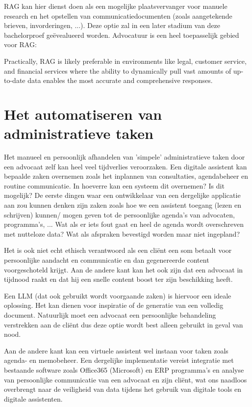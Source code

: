 RAG kan hier dienst doen als een mogelijke plaatsvervanger voor manuele research en het opstellen van communicatiedocumenten (zoals aangetekende brieven, invorderingen, ...). Deze optie zal in
een later stadium van deze bachelorproef geëvealueerd worden. Advocatuur is een heel toepasselijk gebied voor RAG:

\begin{displayquote}
	Practically, RAG is likely preferable in environments like
	legal, customer service, and financial services where the ability to
	dynamically pull vast amounts of up-to-date data enables the most accurate and comprehensive responses.
\end{displayquote}

\section{Het automatiseren van administratieve taken}
Het manueel en persoonlijk afhandelen van 'simpele' administratieve taken door een advocaat zelf kan heel veel tijdverlies veroorzaken. Een digitale assistent kan bepaalde zaken
overnemen zoals het inplannen van consultaties, agendabeheer en routine		communicatie. In hoeverre kan een systeem dit overnemen? Is dit mogelijk?
De eerste dingen waar een ontwikkelaar van een dergelijke applicatie aan zou kunnen denken zijn zaken zoals hoe we een assistent toegang (lezen en schrijven) kunnen/ mogen geven tot
de persoonlijke agenda's van advocaten, programma's, ... Wat als er iets fout gaat en heel de agenda wordt overschreven met nutteloze data? Wat als afspraken bevestigd worden maar niet ingepland?

Het is ook niet echt ethisch verantwoord als een cliënt een som betaalt voor persoonlijke aandacht en communicatie en dan gegenereerde content voorgeschoteld krijgt.
Aan de andere kant kan het ook zijn dat een advocaat in tijdnood raakt en dat hij een snelle content boost ter zijn beschikking heeft.

Een LLM (dat ook gebruikt wordt voorgaande zaken) is hiervoor een ideale oplossing. Het kan dienen voor inspiratie of de generatie van een volledig document. Natuurlijk moet
een advocaat een persoonlijke behandeling verstrekken aan de cliënt dus deze optie wordt best alleen gebruikt in geval van nood.

Aan de andere kant kan een virtuele assistent wel instaan voor taken zoals agenda- en memobeheer.
Een dergelijke implementatie vereist integratie met bestaande software zoals Office365 (Microsoft) en ERP programma's en analyse van persoonlijke communicatie van een advocaat en zijn cliënt,
wat ons naadloos overbrengt naar de veiligheid van data tijdens het gebruik van digitale tools en digitale assistenten.

